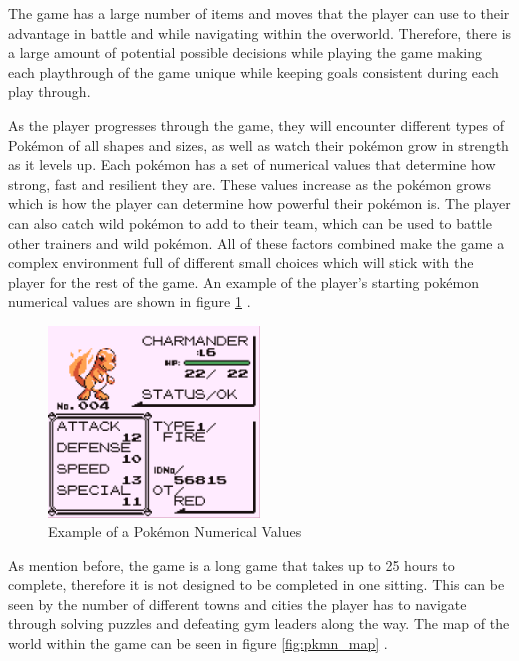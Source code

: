 The game has a large number of items and moves that the player can use to their advantage in battle and while navigating within the overworld. Therefore, there is a large amount of potential possible decisions while playing the game making each playthrough of the game unique while keeping goals consistent during each play through\cite{HubZ_1998}.

As the player progresses through the game, they will encounter different types of Pokémon of all shapes and sizes, as well as watch their pokémon grow in strength as it levels up. Each pokémon has a set of numerical values that determine how strong, fast and resilient they are. These values increase as the pokémon grows which is how the player can determine how powerful their pokémon is. The player can also catch wild pokémon to add to their team, which can be used to battle other trainers and wild pokémon. All of these factors combined make the game a complex environment full of different small choices which will stick with the player for the rest of the game. An example of the player's starting pokémon numerical values are shown in figure \ref{fig:pkmn_stats} \cite{HubZ_1998}.

\begin{figure}[H]
    \centering
    \includegraphics[width=0.5\textwidth]{figures/red_stats.png}
    \caption{Example of a Pokémon Numerical Values}
    \label{fig:pkmn_stats}
\end{figure}

As mention before, the game is a long game that takes up to 25 hours to complete, therefore it is not designed to be completed in one sitting. This can be seen by the number of different towns and cities the player has to navigate through solving puzzles and defeating gym leaders along the way. The map of the world within the game can be seen  in figure \ref{fig:pkmn_map} \cite{HubZ_1998}. 

